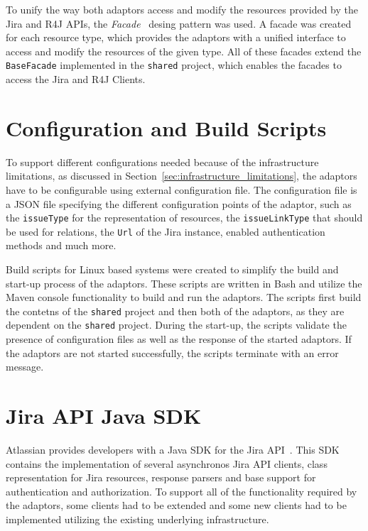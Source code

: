 To unify the way both adaptors access and modify the resources provided by the Jira and R4J APIs, the \emph{Facade} \cite{facade_design_pattern} desing pattern was used. A facade was created for each resource type, which provides the adaptors with a unified interface to access and modify the resources of the given type. All of these facades extend the \texttt{BaseFacade} implemented in the \texttt{shared} project, which enables the facades to access the Jira and R4J Clients.

\section{Configuration and Build Scripts}
To support different configurations needed because of the infrastructure limitations, as discussed in Section \ref{sec:infrastructure_limitations}, the adaptors have to be configurable using external configuration file. The configuration file is a JSON file specifying the different configuration points of the adaptor, such as the \texttt{issueType} for the representation of resources, the \texttt{issueLinkType} that should be used for relations, the \texttt{Url} of the Jira instance, enabled authentication methods and much more.

Build scripts for Linux based systems were created to simplify the build and start-up process of the adaptors. These scripts are written in Bash and utilize the Maven console functionality to build and run the adaptors. The scripts first build the contetns of the \texttt{shared} project and then both of the adaptors, as they are dependent on the \texttt{shared} project. During the start-up, the scripts validate the presence of configuration files as well as the response of the started adaptors. If the adaptors are not started successfully, the scripts terminate with an error message.

\section{Jira API Java SDK}
Atlassian provides developers with a Java SDK for the Jira API \cite{jira_java_sdk}. This SDK contains the implementation of several asynchronos Jira API clients, class representation for Jira resources, response parsers and base support for authentication and authorization. To support all of the functionality required by the adaptors, some clients had to be extended and some new clients had to be implemented utilizing the existing underlying infrastructure.

